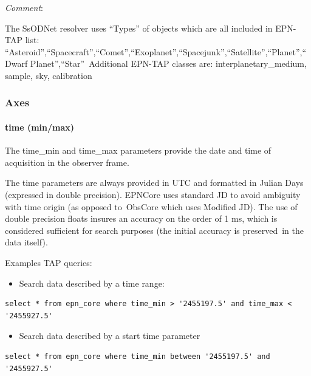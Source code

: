\documentclass[11pt,a4paper]{ivoa}
\begin{document}
\emph{Comment}: 

The SsODNet resolver uses ``Types'' of objects which are all included in EPN-TAP list: ``Asteroid'',``Spacecraft'',``Comet'',``Exoplanet'',``Spacejunk'',``Satellite'',``Planet'',``Dwarf Planet'',``Star'' Additional EPN-TAP classes are: interplanetary\_medium, sample, sky, calibration \\

\subsubsection{Axes \\}

\paragraph{time (min/max)}

The time\_min and time\_max parameters provide the date and time of acquisition in the observer frame. 

The time parameters are always provided in UTC and formatted in Julian Days (expressed in double precision). EPNCore uses standard JD to avoid ambiguity with time origin (as opposed to ObsCore which uses Modified JD). The use of double precision floats insures an accuracy on the order of 1 ms, which is considered sufficient for search purposes (the initial accuracy is preserved in the data itself).

Examples TAP queries:

\begin{itemize}
\item Search data described by a time range:
\end{itemize}






\begin{verbatim}
select * from epn_core where time_min > '2455197.5' and time_max < '2455927.5'
\end{verbatim}




\begin{itemize}
\item Search data described by a start time parameter
\end{itemize}






\begin{verbatim}
select * from epn_core where time_min between '2455197.5' and '2455927.5'
\end{verbatim}
\end{document}
